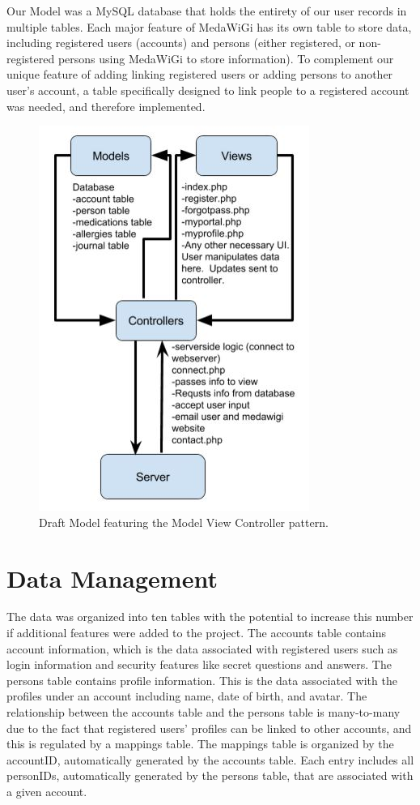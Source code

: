 \documentclass[twocolumn,12pt]{article}
\begin{document}
Our Model was a MySQL database that holds the entirety of our user records in multiple tables. Each major feature of MedaWiGi has its own table to store data, including registered users (accounts) and persons (either registered, or non-registered persons using MedaWiGi to store information). To complement our unique feature of adding linking registered users or adding persons to another user's account, a table specifically designed to link people to a registered account was needed, and therefore implemented. 

\begin{figure}[!htb] 
	\centering
	\includegraphics[scale=1]{./490/MVC2.jpg}
	\caption{Draft Model featuring the Model View Controller pattern.}
\end{figure} 

\section{Data Management}
The data was organized into ten tables with the potential to increase this number if additional features were added to the project. The accounts table contains account information, which is the data associated with registered users such as login information and security features like secret questions and answers. The persons table contains profile information. This is the data associated with the profiles under an account including name, date of birth, and avatar. The relationship between the accounts table and the persons table is many-to-many due to the fact that registered users’ profiles can be linked to other accounts, and this is regulated by a mappings table. The mappings table is organized by the accountID, automatically generated by the accounts table. Each entry includes all personIDs, automatically generated by the persons table, that are associated with a given account.
\end{document}
